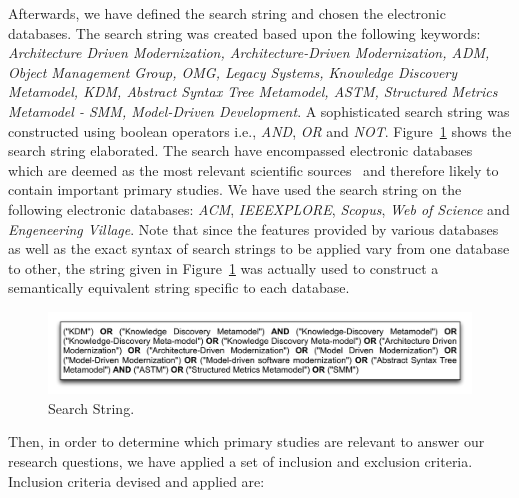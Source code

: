 Afterwards, we have defined the search string and chosen the electronic databases. The search string was created based upon the following keywords: \textit{Architecture Driven Modernization, Architecture-Driven Modernization, ADM, Object Management Group, OMG, Legacy Systems, Knowledge Discovery Metamodel, KDM, Abstract Syntax Tree Metamodel, ASTM, Structured Metrics Metamodel - SMM, Model-Driven Development}. A sophisticated search string was constructed using boolean operators i.e., \textit{AND}, \textit{OR} and \textit{NOT}. Figure~\ref{search_string} shows the search string elaborated. The search have encompassed electronic databases which are deemed as the most relevant scientific sources~\cite{Dyba} and therefore likely to contain important primary studies. We have used the search string on the following electronic databases: \textit{ACM}, \textit{IEEEXPLORE}, \textit{Scopus}, \textit{Web of Science} and \textit{Engeneering Village}. Note that since the features provided by various databases as well as the exact syntax of search strings to be applied vary from one database to other, the string given in Figure~\ref{search_string} was actually used to construct a semantically equivalent string specific to each database.


\begin{figure}[!h]
\centering
  \includegraphics[scale=0.35]{figuras/SearchStringADM}
\caption{Search String.}
\label{search_string}
\end{figure} 

Then, in order to determine which primary studies are relevant to answer our research questions, we have applied a set of inclusion and exclusion criteria. Inclusion criteria devised and applied are:

